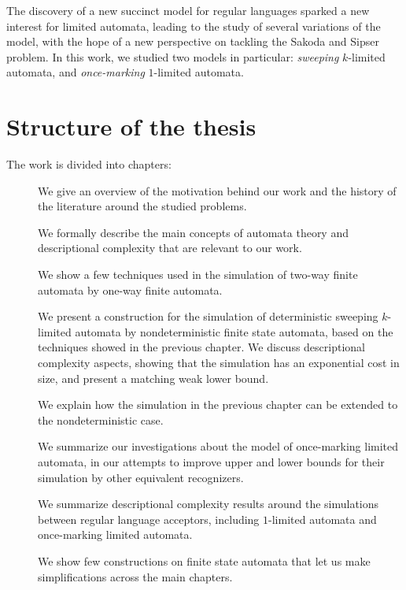 The discovery of a new succinct model for regular languages sparked a new interest for limited automata, leading to the study of several variations of the model, with the hope of a new perspective on tackling the Sakoda and Sipser problem.
In this work, we studied two models in particular: \emph{sweeping} $k$-limited automata, and \emph{once-marking} $1$-limited automata.



\section{Structure of the thesis}
The work is divided into chapters:
\begin{description}
	\item[] We give an overview of the motivation behind our work and the history of the literature around the studied problems.
	\item[] We formally describe the main concepts of automata theory and descriptional complexity that are relevant to our work.
	\item[] We show a few techniques used in the simulation of two-way finite automata by one-way finite automata.
	\item[] We present a construction for the simulation of deterministic sweeping $k$-limited automata by nondeterministic finite state automata, based on the techniques showed in the previous chapter. We discuss descriptional complexity aspects, showing that the simulation has an exponential cost in size, and present a matching weak lower bound.
	\item[] We explain how the simulation in the previous chapter can be extended to the nondeterministic case.
	\item[] We summarize our investigations about the model of once-marking limited automata, in our attempts to improve upper and lower bounds for their simulation by other equivalent recognizers.
	\item[] We summarize descriptional complexity results around the simulations between regular language acceptors, including $1$-limited automata and once-marking limited automata.
	\item[] We show few constructions on finite state automata that let us make simplifications across the main chapters.
\end{description}
